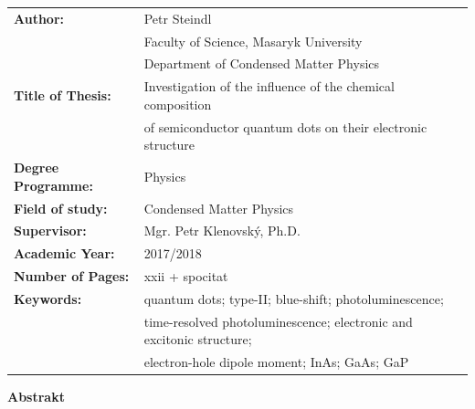 \documentclass[
a4paper, %
11pt, %
onecolumn, %
openany, %
oldfontcommands,
]{memoir}
\begin{document}
\normalsize
\begin{tabular}{ll}
	\textbf{Author:} & Petr Steindl \\[-0.5cm]
	& Faculty of Science, Masaryk University \\[-0.5cm]
	& Department of Condensed Matter Physics \\[-0.5cm]
	\textbf{Title of Thesis:} &  Investigation of the influence of the chemical composition \\[-0.5cm]
	& of semiconductor quantum dots on their electronic structure\\
	\textbf{Degree Programme:}& Physics \\
	\textbf{Field of study:}& Condensed Matter Physics \\
	\textbf{Supervisor:}& Mgr. Petr Klenovský, Ph.D. \\
	\textbf{Academic Year:}& 2017/2018 \\
	\textbf{Number of Pages:}& xxii + spocitat \\
	\textbf{Keywords:}& quantum dots; type-II; blue-shift; photoluminescence; \\[-0.5cm]
	&time-resolved photoluminescence; electronic and excitonic structure;\\[-0.5cm]
	& electron-hole dipole moment; InAs; GaAs; GaP \\
\end{tabular}
\renewcommand{\arraystretch}{1} 
\newpage

\cleardoublepage

\noindent\Large\textbf{Abstrakt}\\ \normalsize



\end{document}
